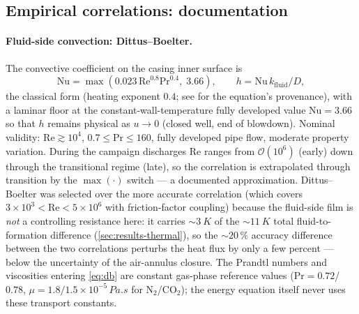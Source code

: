 \documentclass[11pt]{article}
\newcommand{\co}{CO$_2$}
\begin{document}
\subsection{Empirical correlations: documentation}
\label{sec:correlations}

\paragraph{Fluid-side convection: Dittus--Boelter.} The convective
coefficient on the casing inner surface is
\begin{equation}
\mathrm{Nu} = \max\!\left(0.023\,\mathrm{Re}^{0.8}\mathrm{Pr}^{0.4},
\; 3.66\right),
\qquad h = \mathrm{Nu}\,k_{\mathrm{fluid}}/D,
\label{eq:db}
\end{equation}
the classical \citet{dittus1930} form (heating exponent $0.4$; see
\citet{winterton1998} for the equation's provenance), with a laminar
floor at the constant-wall-temperature fully developed value
$\mathrm{Nu} = 3.66$ so that $h$ remains physical as $u \to 0$
(closed well, end of blowdown). Nominal validity:
$\mathrm{Re} \gtrsim 10^4$, $0.7 \le \mathrm{Pr} \le 160$, fully
developed pipe flow, moderate property variation. During the campaign
discharges $\mathrm{Re}$ ranges from $\mathcal{O}(10^6)$ (early) down
through the transitional regime (late), so the correlation is
extrapolated through transition by the $\max(\cdot)$ switch ---
a documented approximation. Dittus--Boelter was selected over the more
accurate \citet{gnielinski1976} correlation (which covers
$3\times10^3 < \mathrm{Re} < 5\times10^6$ with friction-factor
coupling) because the fluid-side film is \emph{not} a controlling
resistance here: it carries ${\sim}\SI{3}{K}$ of the
${\sim}\SI{11}{K}$ total fluid-to-formation difference
(\cref{sec:results-thermal}), so the ${\sim}20\,\%$ accuracy
difference between the two correlations perturbs the heat flux by only
a few percent --- below the uncertainty of the air-annulus closure.
The Prandtl numbers and viscosities entering \cref{eq:db} are constant
gas-phase reference values ($\mathrm{Pr} = 0.72$/$0.78$,
$\mu = 1.8/1.5\times10^{-5}\,\si{Pa.s}$ for N$_2$/\co); the energy
equation itself never uses these transport constants.
\end{document}
